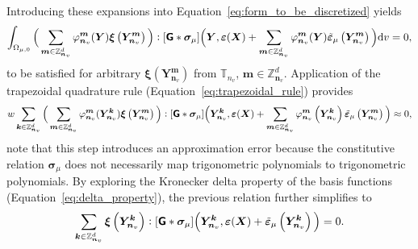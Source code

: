 Introducing these expansions into Equation~\eqref{eq:form_to_be_discretized} yields
\begin{equation}
\int_{\Omega_{\mu,0}}\Big(\sum_{\bm  m \in \mathbb{Z}_{\bm n_v}^{d}} \varphi_{\bm n_v}^{\bm  m}(\bm{Y}) \bm\xi\left(\bm{Y}_{\bm n_v}^{\bm  m}\right)  \Big ):[\boldsymbol{\mathsf{G}} * \bm{\sigma}_\mu]\Big(\bm{Y}, \bm{\varepsilon}(\bm X)+\sum_{\bm  m \in \mathbb{Z}_{\bm n_v}^{d}} \varphi_{\bm n_v}^{\bm  m}(\bm{Y}) \tilde{\bm \varepsilon}_\mu \left(\bm Y_{\bm n_v}^{\bm  m}\right) \Big) \mathrm{d} v=0,
\end{equation}
to be satisfied for arbitrary \(\bm\xi\left(\bm{Y}_{\bm n_v}^{\bm  m}\right)\) from \(\mathbb T_{n_v}\), \(\bm m \in \mathbb Z^d_{\bm n_v}\).
Application of the trapezoidal quadrature rule (Equation~\eqref{eq:trapezoidal_rule}) provides
\begin{equation}
w \sum_{\bm  k \in \mathbb{Z}_{\bm n_v}^{d}}\Big(\sum_{\bm  m \in \mathbb{Z}_{\bm n_v}^{d}} \varphi_{\bm n_v}^{\bm  m}(\bm Y_{\bm n_v}^{\bm  k}) \bm\xi\left(\bm{Y}_{\bm n_v}^{\bm  m}\right)\Big):[\boldsymbol{\mathsf{G}} * \bm{\sigma}_\mu]\Big(\bm Y_{\bm n_v}^{\bm  k}, \bm \varepsilon(\bm X)+\sum_{\bm  m \in \mathbb{Z}_{\bm n_v}^{d}} \varphi_{\bm n_v}^{\bm  m}\left(\bm Y_{\bm n_v}^{\bm  k}\right) \tilde{\bm \varepsilon}_\mu \left(\bm Y_{\bm n_v}^{\bm  m}\right)\Big) \approx 0,
\end{equation}
note that this step introduces an approximation error because the constitutive relation \(\bm{\sigma}_\mu\) does not necessarily map trigonometric polynomials to trigonometric polynomials.
By exploring the Kronecker delta property of the basis functions (Equation~\eqref{eq:delta_property}), the previous relation further simplifies to
\begin{equation} \label{eq:final_variational_form}
\sum_{\bm  k \in \mathbb{Z}_{\bm n_v}^{d}} \bm\xi\left(\bm{Y}_{\bm n_v}^{\bm  k}\right):[\boldsymbol{\mathsf{G}} * \bm\sigma_\mu]\Big(\bm Y_{\bm n_v}^{\bm k}, \bm \varepsilon(\bm X)+\tilde{\bm \varepsilon}_\mu \left(\bm Y_{\bm n_v}^{\bm  k}\right)\Big)=0.
\end{equation}


